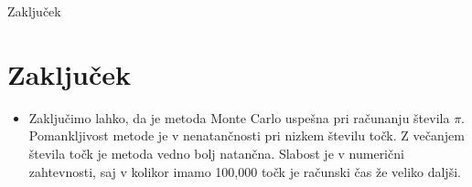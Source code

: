\begin{frame}{Zaključek}
\section{Zaključek}


\begin{itemize}
    \item Zaključimo lahko, da je metoda Monte Carlo uspešna pri računanju števila $\pi$. Pomankljivost metode je v nenatančnosti pri nizkem številu točk. Z večanjem števila točk je metoda vedno bolj natančna. Slabost je v numerični zahtevnosti, saj v kolikor imamo 100,000 točk je računski čas že veliko daljši.
\end{itemize}

\end{frame}

